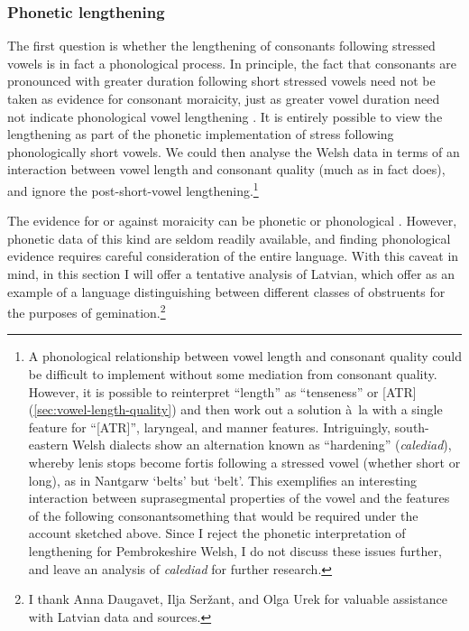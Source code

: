 \subsubsection{Phonetic lengthening}
\label{sec:phonetic-lengthening}

The first question is whether the lengthening of consonants following stressed vowels is in fact a phonological process. In principle, the fact that consonants are pronounced with greater duration following short stressed vowels need not be taken as evidence for consonant moraicity, just as greater vowel duration need not indicate phonological vowel lengthening \citep[\cfm][§4.5.3]{hayes1995}. It is entirely possible to view the lengthening as part of the phonetic implementation of stress following phonologically short vowels. We could then analyse the Welsh data in terms of an interaction between vowel length and consonant quality (much as \citealt{awbery86:_pembr_welsh} in fact does), and ignore the post\hyp short\hyp vowel lengthening.\footnote{\label{fn:calediad}A phonological relationship between vowel length and consonant quality could be difficult to implement without some mediation from consonant quality. However, it is possible to reinterpret \enquote{length} as \enquote{tenseness} or [ATR] (\cref{sec:vowel-length-quality}) and then work out a solution à~la \citet{youssef10:_laryn_buchan_scots} with a single feature for \enquote{[ATR]}, laryngeal, and manner features. Intriguingly, south-eastern Welsh dialects \citep{thomas-sewales,thomas93:_tafod_nantg} show an alternation known as \enquote{hardening} (\emph{calediad}), whereby lenis stops become fortis following a stressed vowel (whether short or long), as in Nantgarw  `belts' but  `belt'. This exemplifies an interesting interaction between suprasegmental properties of the vowel and the features of the following consonant\dash something that would be required under the account sketched above. Since I reject the phonetic interpretation of lengthening for Pembrokeshire Welsh, I do not discuss these issues further, and leave an analysis of \emph{calediad} for further research.}

The evidence for or against moraicity can be phonetic or phonological \citep[\cfm][]{pycha09:_lengt,pycha10}. However, phonetic data of this kind are seldom readily available, and finding phonological evidence requires careful consideration of the entire language. With this caveat in mind, in this section I will offer a tentative analysis of Latvian, which \citet{bye08} offer as an example of a language distinguishing between different classes of obstruents for the purposes of gemination.\footnote{I thank Anna Daugavet, Ilja Seržant, and Olga Urek for valuable assistance with Latvian data and sources.}

